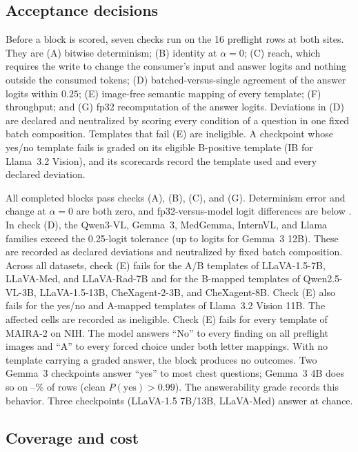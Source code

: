 \subsection{Acceptance decisions}
\label{app:cf-gates}

Before a block is scored, seven checks run on the 16 preflight rows at both sites. They are (A) bitwise determinism; (B) identity at $\alpha=0$; (C) reach, which requires the write to change the consumer's input and answer logits and nothing outside the consumed tokens; (D) batched-versus-single agreement of the answer logits within $0.25$; (E) image-free semantic mapping of every template; (F) throughput; and (G) fp32 recomputation of the answer logits. Deviations in (D) are declared and neutralized by scoring every condition of a question in one fixed batch composition. Templates that fail (E) are ineligible. A checkpoint whose yes/no template fails is graded on its eligible B-positive template (IB for Llama~3.2 Vision), and its scorecards record the template used and every declared deviation.

All \cfWriteBlocks{} completed blocks pass checks (A), (B), (C), and (G). Determinism error and change at $\alpha=0$ are both zero, and fp32-versus-model logit differences are below \cfGateFpMax{}. In check (D), the Qwen3-VL, Gemma~3, MedGemma, InternVL, and Llama families exceed the 0.25-logit tolerance (up to \cfGateBatchMax{} logits for Gemma~3 12B). These are recorded as declared deviations and neutralized by fixed batch composition. Across all datasets, check (E) fails for the A/B templates of LLaVA-1.5-7B, LLaVA-Med, and LLaVA-Rad-7B and for the B-mapped templates of Qwen2.5-VL-3B, LLaVA-1.5-13B, CheXagent-2-3B, and CheXagent-8B. Check (E) also fails for the yes/no and A-mapped templates of Llama~3.2 Vision 11B. The affected cells are recorded as ineligible. Check (E) fails for every template of MAIRA-2\cite{bannur2024maira} on NIH. The model answers ``No'' to every finding on all \cfSpecUngradedRows{} preflight images and ``A'' to every forced choice under both letter mappings. With no template carrying a graded answer, the block produces no outcomes. Two Gemma~3 checkpoints answer ``yes'' to most chest questions; Gemma~3 4B does so on \cfGemmaFourYesMin--\cfGemmaFourYesMax\% of rows (clean $P(\mathrm{yes})>0.99$). The answerability grade records this behavior. Three checkpoints (LLaVA-1.5 7B/13B, LLaVA-Med) answer at chance.

\subsection{Coverage and cost}
\label{app:cf-coverage}

